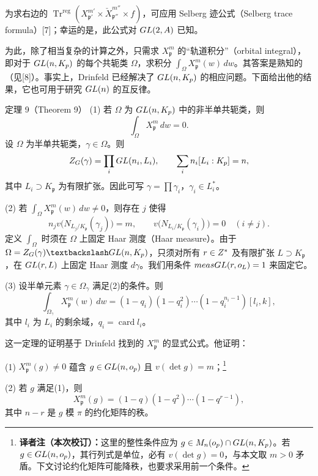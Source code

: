 为求右边的 $\operatorname{Tr}^{\mathrm{reg}}(X_{\mathfrak p'}^{m'}\times\check X_{\mathfrak p''}^{m''}\times f)$，可应用 Selberg 迹公式（Selberg trace formula）[7]；幸运的是，此公式对 $GL(2,A)$ 已知。

为此，除了相当复杂的计算之外，只需求 $X_{\mathfrak p}^m$ 的“轨道积分”（orbital integral），即对于 $GL(n,K_{p})$ 的每个共轭类 $\Omega$，求积分 $\int_\Omega X_{\mathfrak p}^m(w)\,dw$。其答案是熟知的（见[8]）。事实上，Drinfeld 已经解决了 $GL(n,K_{p})$ 的相应问题。下面给出他的结果，它也可用于研究 $GL(n)$ 的互反律。

\begin{originaltheorem}{定理 9（Theorem 9）}
(1) 若 $\Omega$ 为 $GL(n,K_{p})$ 中的非半单共轭类，则
\[
 \int_\Omega X_{\mathfrak p}^m\,dw=0.
\]
设 $\Omega$ 为半单共轭类，$\gamma\in\Omega$。则
\[
 Z_G(\gamma)=\prod_iGL(n_i,L_i),
 \qquad \sum_i n_i[L_i:K_{p}]=n,
\]
其中 $L_i\supset K_{\mathfrak p}$ 为有限扩张。因此可写 $\gamma=\prod\gamma_i$，$\gamma_i\in L_i^*$。

(2) 若 $\int_\Omega X_{\mathfrak p}^m(w)\,dw\ne0$，则存在 $j$ 使得
\[
 n_jv\bigl(N_{L_j/K_{\mathfrak p}}(\gamma_j)\bigr)=m,
 \qquad v\bigl(N_{L_i/K_{\mathfrak p}}(\gamma_i)\bigr)=0\quad(i\ne j).
\]
定义 $\int_\Omega$ 时须在 $\Omega$ 上固定 Haar 测度（Haar measure）。由于 $\Omega=Z_G(\gamma)\backslash\GL(n,K_{\mathfrak p})$，只须对所有 $r\in Z^*$ 及有限扩张 $L\supset K_{\mathfrak p}$，在 $GL(r,L)$ 上固定 Haar 测度 $d\gamma$。我们用条件 $measGL(r,o_L)=1$ 来固定它。

(3) 设半单元素 $\gamma\in\Omega_\gamma$ 满足(2)的条件。则
\[
 \int_{\Omega_\gamma}X_{\mathfrak p}^m(w)\,dw
 =(1-q_i)(1-q_i^2)\cdots(1-q_i^{n_i-1})[l_i,k],
\]
其中 $l_i$ 为 $L_i$ 的剩余域，$q_i=\operatorname{card}l_i$。
\end{originaltheorem}

这一定理的证明基于 Drinfeld 找到的 $X_{\mathfrak p}^m$ 的显式公式。他证明：

(1) $X_{\mathfrak p}^m(g)\ne0$ 蕴含 $g\in GL(n,o_{p})$ 且 $v(\det g)=m$；\footnote{\textbf{译者注（本次校订）：}这里的整性条件应为 $g\in M_n(o_{p})\cap GL(n,K_{p})$。若 $g\in GL(n,o_{p})$，其行列式是单位，必有 $v(\det g)=0$，与本文取 $m>0$ 矛盾。下文讨论约化矩阵可能降秩，也要求采用前一个条件。}

(2) 若 $g$ 满足(1)，则
\[
 X_{\mathfrak p}^m(g)=(1-q)(1-q^2)\cdots(1-q^{r-1}),
\]
其中 $n-r$ 是 $g$ 模 $\pi$ 的约化矩阵的秩。

